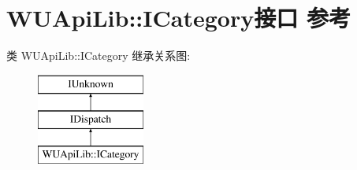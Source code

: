 \hypertarget{interface_w_u_api_lib_1_1_i_category}{}\section{W\+U\+Api\+Lib\+:\+:I\+Category接口 参考}
\label{interface_w_u_api_lib_1_1_i_category}
类 W\+U\+Api\+Lib\+:\+:I\+Category 继承关系图\+:\begin{figure}[H]
\begin{center}
\leavevmode
\includegraphics[height=3.000000cm]{interface_w_u_api_lib_1_1_i_category}
\end{center}
\end{figure}
